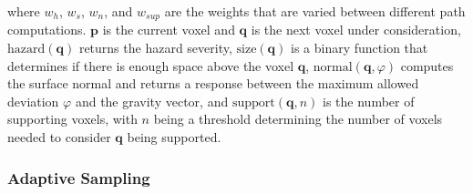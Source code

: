 \documentclass{egpubl}
\begin{document}
\noindent where $w_h$, $w_s$, $w_n$, and $w_{sup}$ are the weights that are varied between different path computations. $\mathbf{p}$ is the current voxel and $\mathbf{q}$ is the next voxel under consideration, $\textrm{hazard}(\mathbf{q})$ returns the hazard severity, $\textrm{size}(\mathbf{q})$ is a binary function that determines if there is enough space above the voxel $\mathbf{q}$, $\textrm{normal}(\mathbf{q},\varphi)$ computes the surface normal and returns a response between the maximum allowed deviation $\varphi$ and the gravity vector, and $\mathrm{support}(\mathbf{q},n)$ is the number of supporting voxels, with $n$ being a threshold determining the number of voxels needed to consider $\mathbf{q}$ being supported.

\subsubsection{Adaptive Sampling}
\end{document}
